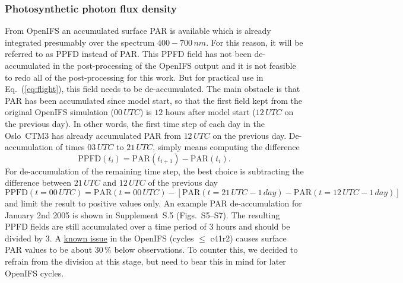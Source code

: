\documentclass[gmd, manuscript]{copernicus}
\begin{document}
\subsubsection{Photosynthetic photon flux density}
From OpenIFS an accumulated surface PAR is available which is already integrated presumably over the spectrum $400-700\,\unit{nm}$. For this reason, it will be referred to as PPFD instead of PAR. This PPFD field has not been de-accumulated in the post-processing of the OpenIFS output and it is not feasible to redo all of the post-processing for this work. But for practical use in Eq.~(\ref{eq:flight}), this field needs to be de-accumulated. The main obstacle is that PAR has been accumulated since model start, so that the first field kept from the original OpenIFS simulation ($00\,\unit{UTC}$) is $12$ hours after model start ($12\,\unit{UTC}$ on the previous day). In other words, the first time step of each day in the Oslo~CTM3 has already accumulated PAR from $12\,\unit{UTC}$ on the previous day.
De-accumulation of times $03\,\unit{UTC}$ to $21\,\unit{UTC}$, simply means computing the difference
\begin{equation}
  \text{PPFD}(t_i) = \text{PAR}(t_{i+1})-\text{PAR}(t_i).
\end{equation}
For de-accumulation of the remaining time step, the best choice is subtracting the difference between $21\,\unit{UTC}$ and $12\,\unit{UTC}$ of the previous day
%
\begin{equation}
  \text{PPFD}(t=00\,\unit{UTC}) = \text{PAR}(t=00\,\unit{UTC}) - \left[\text{PAR}(t=21\,\unit{UTC}-1\,\unit{day})-\text{PAR}(t=12\,\unit{UTC}-1\,\unit{day})\right]
\end{equation}
%
and limit the result to positive values only. An example PAR de-accumulation for January 2nd 2005 is shown in Supplement~S.5 (Figs.~S5--S7).
The resulting PPFD fields are still accumulated over a time period of $3$ hours and should be divided by $3$. A \href{https://confluence.ecmwf.int/display/CKB/ERA-Interim\%3A+surface+photosynthetically+active+radiation+\%28surface+PAR\%29+values+are+too+low}{known issue} in the OpenIFS (cycles $\le$ c41r2) causes surface PAR values to be about $30\,\unit{\%}$ below observations. To counter this, we decided to refrain from the division at this stage, but need to bear this in mind for later OpenIFS cycles.

\end{document}

